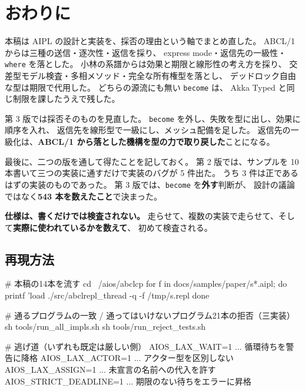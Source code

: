 \documentclass[11pt,a4paper]{ltjsarticle}
\theoremstyle{definition}
\theoremstyle{remark}
\begin{document}
\section{おわりに}

本稿は AIPL の設計と実装を、採否の理由という軸でまとめ直した。
ABCL/1 からは三種の送信・逐次性・返信を採り、
express mode・返信先の一級性・\texttt{where} を落とした。
小林の系譜からは効果と期限と線形性の考え方を採り、
交差型モデル検査・多相メソッド・完全な所有権型を落とし、
デッドロック自由な型は期限で代用した。
どちらの源流にも無い \texttt{become} は、
Akka Typed と同じ制限を課したうえで残した。

第 3 版では採否そのものを見直した。
\texttt{become} を外し、失敗を型に出し、効果に順序を入れ、
返信先を線形型で一級にし、メッシュ配備を足した。
返信先の一級化は、\textbf{ABCL/1 から落とした機構を型の力で取り戻した}ことになる。

最後に、二つの版を通して得たことを記しておく。
第 2 版では、サンプルを 10 本書いて三つの実装に通すだけで実装のバグが 5 件出た。
うち 3 件は正であるはずの実装のものであった。
第 3 版では、\texttt{become} を\textbf{外す}判断が、
設計の議論ではなく\textbf{543 本を数えたこと}で決まった。

\textbf{仕様は、書くだけでは検査されない。}
走らせて、複数の実装で走らせて、そして\textbf{実際に使われているかを数えて}、
初めて検査される。

\subsection*{再現方法}

\begin{term}
# 本稿の14本を流す
cd ~/aios/abclcp
for f in docs/samples/paper/s*.aipl; do
  printf 'load %
  ./src/abclrepl_thread -q -f /tmp/s.repl
done

# 通るプログラムの一致 / 通ってはいけないプログラム21本の拒否（三実装）
sh tools/run_all_impls.sh
sh tools/run_reject_tests.sh

# 逃げ道（いずれも既定は厳しい側）
AIOS_LAX_WAIT=1    ... 循環待ちを警告に降格
AIOS_LAX_ACTOR=1   ... アクター型を区別しない
AIOS_LAX_ASSIGN=1  ... 未宣言の名前への代入を許す
AIOS_STRICT_DEADLINE=1 ... 期限のない待ちをエラーに昇格
\end{term}
\end{document}
